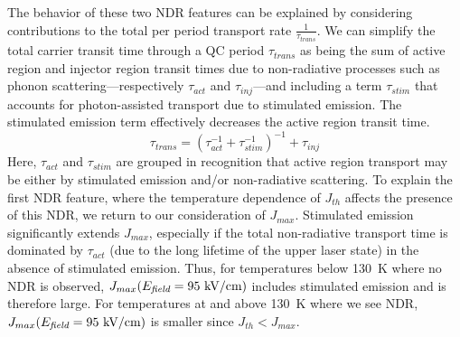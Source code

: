 The behavior of these two NDR features can be explained by considering contributions to the total per period transport rate $\frac{1}{\tau_\textit{trans}}$.  We can simplify the total carrier transit time through a QC period $\tau_\textit{trans}$ as being the sum of active region and injector region transit times due to non-radiative processes such as phonon scattering---respectively $\tau_\textit{act}$ and $\tau_\textit{inj}$---and including a term $\tau_\textit{stim}$ that accounts for photon-assisted transport due to stimulated emission.  The stimulated emission term effectively decreases the active region transit time.%
\begin{equation}
\tau_\textit{trans} = \left(\tau_\textit{act}^{-1} + \tau_\textit{stim}^{-1} \right)^{-1} + \tau_\textit{inj}
\end{equation}
Here, $\tau_\textit{act}$ and $\tau_\textit{stim}$ are grouped in recognition that active region transport may be either by stimulated emission and/or non-radiative scattering.  To explain the first NDR feature, where the temperature dependence of $J_{th}$ affects the presence of this NDR, we return to our consideration of $J_{max}$.  Stimulated emission significantly extends $J_{max}$, especially if the total non-radiative transport time is dominated by $\tau_\textit{act}$ (due to the long lifetime of the upper laser state) in the absence of stimulated emission.  Thus, for temperatures below 130~K where no NDR is observed, $J_{max}(E_\textit{field}=95~\textnormal{kV/cm})$ includes stimulated emission and is therefore large.  For temperatures at and above 130~K where we see NDR, $J_{max}(E_\textit{field}=95~\textnormal{kV/cm})$ is smaller since $J_{th}<J_{max}$.

